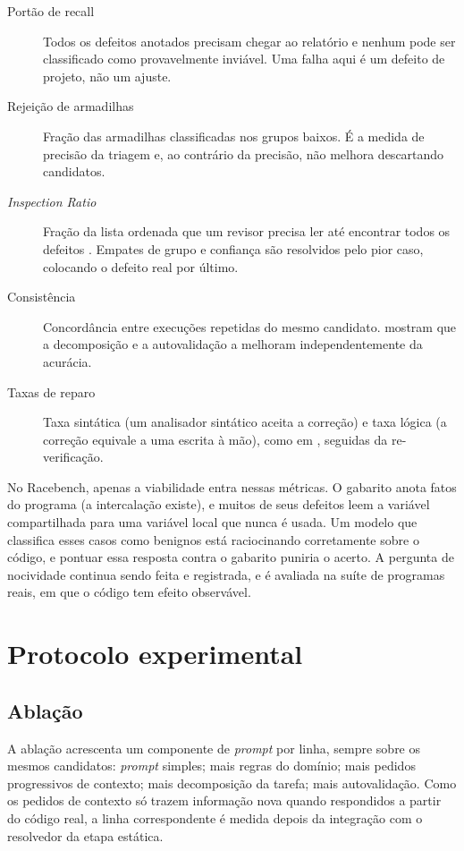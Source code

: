 \begin{description}
  \item[Portão de recall] Todos os defeitos anotados precisam chegar ao relatório
    e nenhum pode ser classificado como provavelmente inviável. Uma falha aqui
    é um defeito de projeto, não um ajuste.
  \item[Rejeição de armadilhas] Fração das armadilhas classificadas nos grupos
    baixos. É a medida de precisão da triagem e, ao contrário da precisão, não
    melhora descartando candidatos.
  \item[\textit{Inspection Ratio}] Fração da lista ordenada que um revisor
    precisa ler até encontrar todos os defeitos \cite{reducing-fp}. Empates de
    grupo e confiança são resolvidos pelo pior caso, colocando o defeito real por
    último.
  \item[Consistência] Concordância entre execuções repetidas do mesmo candidato.
     mostram que a decomposição e a autovalidação a melhoram
    independentemente da acurácia.
  \item[Taxas de reparo] Taxa sintática (um analisador sintático aceita a correção) e taxa
    lógica (a correção equivale a uma escrita à mão), como em
    , seguidas da re-verificação.
\end{description}

No Racebench, apenas a viabilidade entra nessas métricas. O gabarito anota
fatos do programa (a intercalação existe), e muitos de seus defeitos leem
a variável compartilhada para uma variável local que nunca é usada. Um modelo
que classifica esses casos como benignos está raciocinando corretamente sobre o
código, e pontuar essa resposta contra o gabarito puniria o acerto. A pergunta
de nocividade continua sendo feita e registrada, e é avaliada na suíte de
programas reais, em que o código tem efeito observável.

\section{Protocolo experimental}
\label{sec:protocolo}

\subsection{Ablação}

A ablação acrescenta um componente de \textit{prompt} por linha, sempre sobre os
mesmos candidatos: \textit{prompt} simples; mais regras do domínio; mais pedidos
progressivos de contexto; mais decomposição da tarefa; mais autovalidação. Como
os pedidos de contexto só trazem informação nova quando respondidos a partir do
código real, a linha correspondente é medida depois da integração com o
resolvedor da etapa estática.


